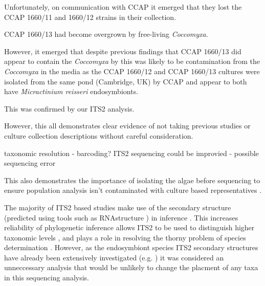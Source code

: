 Unfortunately, on communication with CCAP it emerged that they lost
the CCAP 1660/11 and 1660/12 strains in their collection. 


CCAP 1660/13 had become overgrown by free-living \textit{Coccomyxa}. 

However, it emerged that despite previous findings that CCAP 1660/13
did appear to contain the \textit{Coccomyxa} by \citep{Imamura2008} this was
likely to be contamination from the \textit{Coccomyxa} in the media as 
the CCAP 1660/12 and CCAP 1660/13 cultures were isolated from the same
pond (Cambridge, UK) by CCAP and appear to both have \textit{Micractinium
reisseri} endosymbionts.

This was confirmed by our ITS2 analysis.


However, this all demonstrates clear evidence of not taking previous studies
or culture collection descriptions without careful consideration.





taxonomic resolution - barcoding?
ITS2 sequencing could be improvied - possible sequencing error 



This also demonstrates the importance of isolating the algae
before sequencing to ensure population analysis isn't
contaminated with culture based representatives \citep{Achilles-Day2013a}.



The majority of ITS2 based studies make use of the secondary structure (predicted
using tools such as RNAstructure \citep{Mathews2004}) in inference \citep{Schultz2009}. 
This increases reliability of phylogenetic inference \citep{Keller2008} allows ITS2 to be used
to distinguish higher taxonomic levels \citep{Coleman2003}, and plays a role
in resolving the thorny problem of species determination \citep{Muller2007}. 
However, as the endosymbiont species ITS2 secondary structures have already been extensively
investigated (e.g. \citep{Hoshina2008,Hoshina2010}) it was considered an unneccessary 
analysis that would be unlikely to change the placment of any taxa in
this sequencing analysis. 







